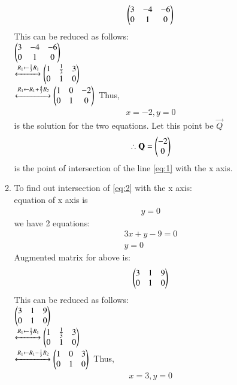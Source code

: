 \documentclass[journal,12pt,twocolumn]{IEEEtran}
\renewcommand\thesection{\arabic{section}}
\begin{document}
\begin{enumerate}[label=\thesection.\arabic*.,ref=\thesection.\theenumi]
\begin{enumerate}
\begin{align}
    \begin{pmatrix}3 & -4 & -6\\
           0 & 1 & 0\end{pmatrix}
\end{align}
This can be reduced as follows:\\
$\begin{pmatrix}3 & -4 & -6\\
           0 & 1 & 0\end{pmatrix}$\\
    $\xleftrightarrow {R_1 \leftarrow \frac{1}{3}R_1}
    \begin{pmatrix}1 & \frac{1}{3} & 3\\
          0 & 1 & 0\end{pmatrix}\\$\\
          $\xleftrightarrow{R_1 \leftarrow R_1 + \frac{4}{3}R_2}
    \begin{pmatrix}1 &0&-2\\
        0&1&0\end{pmatrix}\\$
Thus,
\begin{align}
    x=-2, y=0
\end{align} 
is the solution for the two equations. 
Let this point be $\vec{Q}$
\begin{align}
\therefore \mathbf{Q}=\begin{pmatrix}-2\\0\end{pmatrix}
\end{align}
is the point of intersection of the line \ref{eq:1} with the x axis.
\item To find out intersection of \ref{eq:2} with the x axis:\\
    equation of x axis is \begin{align}
        y=0
    \end{align}
    we have 2 equations: \begin{align}
        3x+y-9=0\\y=0
    \end{align}
    Augmented matrix for above is:
\begin{align}
    \begin{pmatrix}3 & 1 & 9\\
           0 & 1 & 0\end{pmatrix}
\end{align}
This can be reduced as follows:\\
$\begin{pmatrix}3 & 1 & 9\\
           0 & 1 & 0\end{pmatrix}$\\
    $\xleftrightarrow {R_1 \leftarrow \frac{1}{3}R_1}
    \begin{pmatrix}1 & \frac{1}{3} & 3\\
          0 & 1 & 0\end{pmatrix}\\$\\
          $\xleftrightarrow{R_1 \leftarrow R_1 - \frac{1}{3}R_2}
    \begin{pmatrix}1 &0&3\\
        0&1&0\end{pmatrix}\\$
Thus,
\begin{align}
    x=3, y=0

\end{align}
\end{enumerate}
\end{enumerate}
\end{document}
